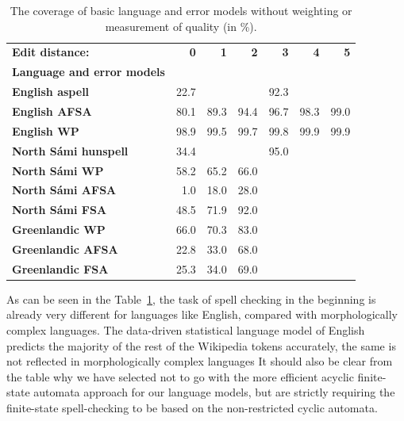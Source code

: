 \documentclass[a4paper,12pt]{article}
\begin{document}
\begin{table}
    \centering
    \begin{tabular}{|l|r|r|r|r|r|r|}
        \hline
        \bf Edit distance: & \bf 0  & \bf 1 & \bf 2 & \bf 3 & \bf 4 & \bf 5 \\
        \bf Language and error models &   &  &  &  &  &  \\
        \hline
        \bf English aspell & 22.7 & \multicolumn{5}{|c|}{92.3}  \\
        \bf English AFSA   & 80.1 & 89.3 & 94.4 & 96.7 & 98.3 & 99.0 \\
            \bf English WP & 98.9 & 99.5 & 99.7 & 99.8 & 99.9 & 99.9 \\
        \hline
        \bf North Sámi hunspell & 34.4 & \multicolumn{5}{|c|}{95.0} \\
        \bf North Sámi WP & 58.2 & 65.2 & 66.0 & & & \\
               \bf North Sámi AFSA & 1.0 & 18.0 & 28.0 & & & \\
               \bf North Sámi FSA & 48.5 & 71.9 & 92.0 & & & \\
        \hline
        \bf Greenlandic WP            & 66.0 & 70.3 & 83.0 & & & \\
                 \bf Greenlandic AFSA & 22.8 & 33.0 & 68.0 & & & \\
                  \bf Greenlandic FSA & 25.3 & 34.0 & 69.0 & & & \\
        \hline
    \end{tabular}
    \caption{The coverage of basic language and error models without weighting
        or measurement of quality (in \%).\label{table:coverage}}
\end{table}

As can be seen in the Table~\ref{table:coverage}, the task of spell
checking in the beginning is already very different for languages like
English, compared with morphologically complex languages. The data-driven
statistical language model of English predicts the majority of the rest of the
Wikipedia tokens accurately, the same is not reflected in morphologically
complex languages It should also be clear from the table why we have selected not
to go with the more efficient acyclic finite-state automata approach for our
language models, but are strictly requiring the finite-state spell-checking to
be based on the non-restricted cyclic automata.
\end{document}
